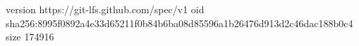 version https://git-lfs.github.com/spec/v1
oid sha256:8995f0892a4e33d65211f0b84b6ba08d85596a1b26476d913d2c46dac188b0c4
size 174916
